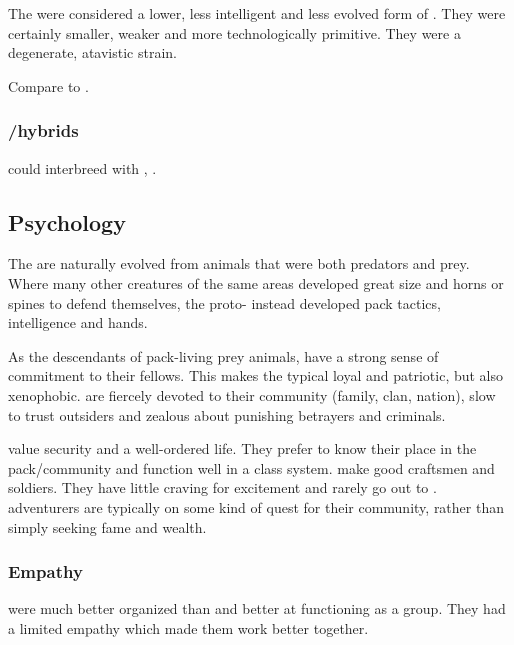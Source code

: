 The \meccara were considered a lower, less intelligent and less evolved form of \scathae. 
They were certainly smaller, weaker and more technologically primitive.
They were a degenerate, atavistic strain.

Compare to \cite{RobertEHoward:WormsoftheEarth}. 





\subsubsection{\Scatha/\naga hybrids}
\Scathae could interbreed with \nagae, . 









\subsection{Psychology}
The \scathae{} are naturally evolved from animals that were both predators and prey. Where many other creatures of the same areas developed great size and horns or spines to defend themselves, the proto-\scathae{} instead developed pack tactics, intelligence and hands. 

As the descendants of pack-living prey animals, \scathae{} have a strong sense of commitment to their fellows. This makes the typical \scatha{} loyal and patriotic, but also xenophobic. \Scathae{} are fiercely devoted to their community (family, clan, nation), slow to trust outsiders and zealous about punishing betrayers and criminals. 

\Scathae{} value security and a well-ordered life. They prefer to know their place in the pack/community and function well in a class system. \Scathae{} make good craftsmen and soldiers. They have little craving for excitement and rarely go out to . \Scathaese{} adventurers are typically on some kind of quest for their community, rather than simply seeking fame and wealth. 





\subsubsection{Empathy}
\Scathae were much better organized than \humans and better at functioning as a group. 
They had a limited empathy which made them work better together. 

